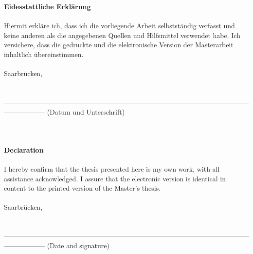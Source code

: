 \vspace*{\fill}

\noindent \textbf{Eidesstattliche Erklärung}
\\
\\
\noindent Hiermit erkläre ich, dass ich die vorliegende Arbeit selbstständig verfasst und keine anderen als die angegebenen Quellen und Hilfsmittel verwendet habe. Ich versichere, dass die gedruckte und die elektronische Version der Masterarbeit inhaltlich
übereinstimmen.
\\
\\
\noindent Saarbrücken,
\\
\\
\\
––––––––––––––––––––––––––––––––––––––––––––––––––––––––––––––––––––––––––––––––––––
(Datum und Unterschrift)
\\
\\
\\
\\
\noindent \textbf{Declaration}
\\
\\
\noindent I hereby confirm that the thesis presented here is my own work, with all assistance acknowledged. I assure that the electronic version is identical in content to the printed version of the Master’s thesis.
\\
\\
\noindent Saarbrücken,
\\
\\
\\
––––––––––––––––––––––––––––––––––––––––––––––––––––––––––––––––––––––––––––––––––––
(Date and signature)

\vspace*{\fill}
